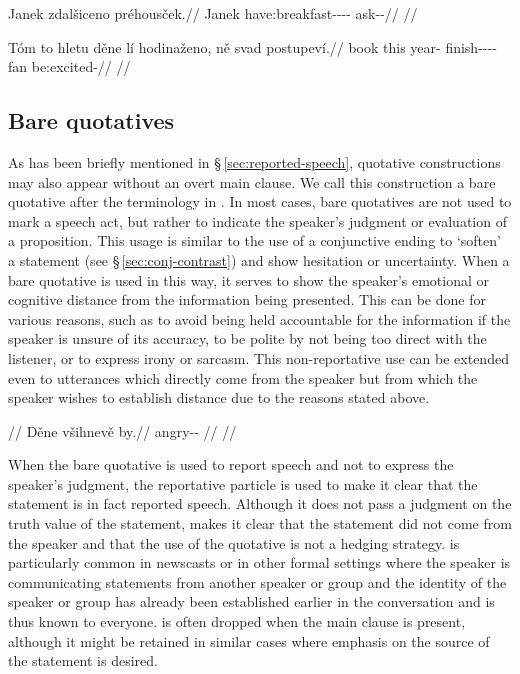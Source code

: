 \pex
\begingl
  \gla Janek zdalšiceno préhousček.//
  \glb Janek have:breakfast-\Av{}-\Pf{}-\Cnj{}-\Comp{} ask-\Av{}-\Pf{}//
  \glft {}//
\endgl
\xe

\pex
\begingl
  \gla Tóm to hletu děne lí hodinaženo, ně svad postupeví.//
  \glb book this year-\Ins{} \Spec{} \Q{} finish-\Pv{}-\Ctp{}-\Cnj{}-\Comp{} \Pl{} fan be:excited-\Cont{}//
  \glft {}//
\endgl
\xe

\subsection{Bare quotatives}
\label{sec:bare-quotatives}

As has been briefly mentioned in \S\,\ref{sec:reported-speech}, quotative
constructions may also appear without an overt main clause. We call this
construction a {\sc bare quotative} after the terminology in
\textcite{tomioka2019}. In most cases, bare quotatives are not used to mark a
speech act, but rather to indicate the speaker's judgment or evaluation of a
proposition. This usage is similar to the use of a conjunctive ending 
to `soften' a statement (see \S\,\ref{sec:conj-contrast}) and show hesitation or
uncertainty. When a bare quotative is used in this way, it serves to show the
speaker's emotional or cognitive distance from the information being presented.
This can be done for various reasons, such as to avoid being held accountable
for the information if the speaker is unsure of its accuracy, to be polite by
not being too direct with the listener, or to express irony or sarcasm. This
non-reportative use can be extended even to utterances which directly come from
the speaker but from which the speaker wishes to establish distance due to the
reasons stated above.

\pex
  \a
  \begingl
  \glpreamble {}//
  \gla Děne všihnevě by.//
  \glb \Spec{} angry-\Cont{}-\Cnj{} \Quot{}//
  \glft {}//
  \endgl
\xe

When the bare quotative is used to report speech and not to express the
speaker's judgment, the reportative particle  is used to make it clear
that the statement is in fact reported speech. Although it does not pass a
judgment on the truth value of the statement,  makes it clear that the
statement did not come from the speaker and that the use of the quotative is not
a hedging strategy.  is particularly common in newscasts or in other
formal settings where the speaker is communicating statements from another
speaker or group and the identity of the speaker or group has already been
established earlier in the conversation and is thus known to everyone.
 is often dropped when the main clause is present, although it might
be retained in similar cases where emphasis on the source of the statement is
desired.


